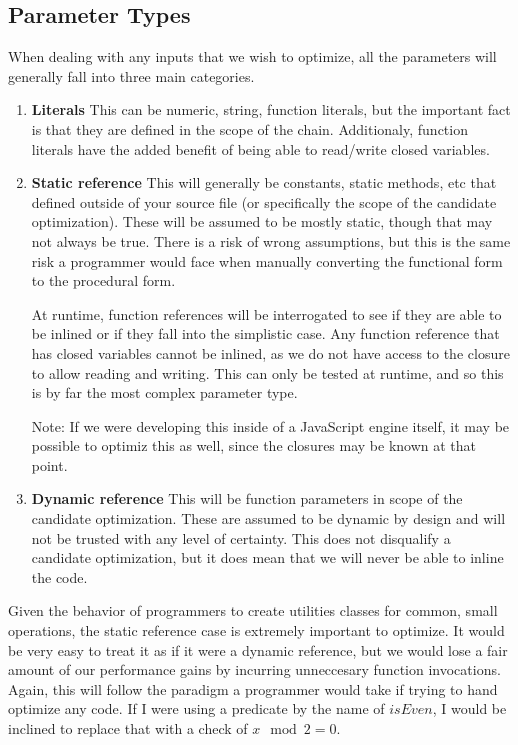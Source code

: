 \subsection{Parameter Types}
When dealing with any inputs that we wish to optimize, all the parameters will generally fall into three main categories.

\begin{enumerate}
  \item \textbf{Literals}
    This can be numeric, string, function literals, but the important fact is that they are defined in the scope of the chain.  Additionaly, function literals have the added benefit of being able to read/write closed variables.

  \item \textbf{Static reference}
    This will generally be constants, static methods, etc that defined outside of your source file (or specifically the scope of the candidate optimization).  These will be assumed to be mostly static, though that may not always be true.  There is a risk of wrong assumptions, but this is the same risk a programmer would face when manually converting the functional form to the procedural form.  
    
    At runtime, function references will be interrogated to see if they are able to be inlined or if they fall into the simplistic case.  Any function reference that has closed variables cannot be inlined, as we do not have access to the closure to allow reading and writing.  This can only be tested at runtime, and so this is by far the most complex parameter type.  
    
    Note: If we were developing this inside of a JavaScript engine itself, it may be possible to optimiz this as well, since the closures may be known at that point.

  \item \textbf{Dynamic reference}
    This will be function parameters in scope of the candidate optimization. These are assumed to be dynamic by design and will not be trusted with any level of certainty.  This does not disqualify a candidate optimization, but it does mean that we will never be able to inline the code.
\end{enumerate}

Given the behavior of programmers to create utilities classes for common, small operations, the static reference case is extremely important to optimize.  It would be very easy to treat it as if it were a dynamic reference, but we would lose a fair amount of our performance gains by incurring unneccesary function invocations.  Again, this will follow the paradigm a programmer would take if trying to hand optimize any code.  If I were using a predicate by the name of $isEven$, I would be inclined to replace that with a check of $x \mod 2 = 0$. 